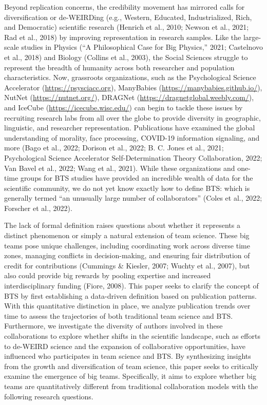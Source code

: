\documentclass[
  man,floatsintext]{apa7}
\begin{document}
Beyond replication concerns, the credibility movement has mirrored calls
for diversification or de-WEIRDing (e.g., Western, Educated,
Industrialized, Rich, and Democratic) scientific research (Henrich et al., 2010; Newson et al., 2021; Rad et al., 2018) by improving representation in research samples.
Like the large-scale studies in Physics ({``A Philosophical Case for Big Physics,''} 2021; Castelnovo et al., 2018)
and Biology (Collins et al., 2003), the Social Sciences struggle to represent
the breadth of humanity across both researcher and population
characteristics. Now, grassroots organizations, such as the
Psychological Science Accelerator (\url{https://psysciacc.org}), ManyBabies
(\url{https://manybabies.github.io/}), NutNet (\url{https://nutnet.org/}),
DRAGNet (\url{https://dragnetglobal.weebly.com/}), and IceCube
(\url{https://icecube.wisc.edu/}) can begin to tackle these issues by
recruiting research labs from all over the globe to provide diversity in
geographic, linguistic, and researcher representation. Publications have
examined the global understanding of morality, face processing, COVID-19
information signaling, and more (Bago et al., 2022; Dorison et al., 2022; B. C. Jones et al., 2021; Psychological Science Accelerator Self-Determination Theory Collaboration, 2022; Van Bavel et al., 2022; Wang et al., 2021). While these organizations and one-time groups
for BTS studies have provided an incredible wealth of data for the
scientific community, we do not yet know exactly how to define BTS: which is generally termed ``an unusually large number of collaborators''
(Coles et al., 2022; Forscher et al., 2022).

The lack of formal definition raises questions about whether it
represents a distinct phenomenon or simply a natural extension of team
science. These big teams pose unique challenges, including coordinating
work across diverse time zones, managing conflicts in decision-making,
and ensuring fair distribution of credit for contributions
(Cummings \& Kiesler, 2007; Wuchty et al., 2007), but also could provide big rewards by
pooling expertise and increased interdisciplinary funding (Fiore, 2008).
This paper seeks to clarify the concept of BTS by first establishing a
data-driven definition based on publication patterns. With this
quantitative distinction in place, we analyze publication trends over
time to assess the trajectories of both traditional team science and
BTS. Furthermore, we investigate the diversity of authors involved in
these collaborations to explore whether shifts in the scientific
landscape, such as efforts to de-WEIRD science and the expansion of
collaborative opportunities, have influenced who participates in team
science and BTS. By synthesizing insights from the growth and
diversification of team science, this paper seeks to critically examine
the emergence of big teams. Specifically, it aims to explore whether big
teams are quantitatively different from traditional collaboration models
with the following research questions.
\end{document}
